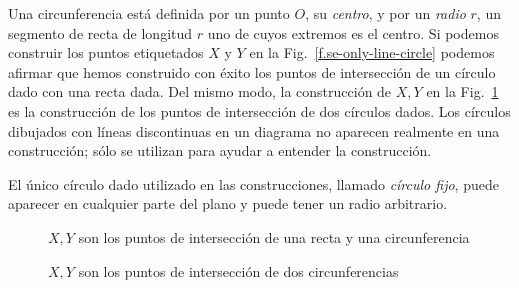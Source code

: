 Una circunferencia está definida por un punto $O$, su \emph{centro}, y por un \emph{radio} $r$, un segmento de recta de longitud $r$ uno de cuyos extremos es el centro. Si podemos construir los puntos etiquetados $X$ y $Y$ en la Fig.~\ref{f.se-only-line-circle} podemos afirmar que hemos construido con éxito los puntos de intersección de un círculo dado con una recta dada. Del mismo modo, la construcción de $X,Y$ en la Fig.~\ref{f.se-only-two-circles} es la construcción de los puntos de intersección de dos círculos dados. Los círculos dibujados con líneas discontinuas en un diagrama no aparecen realmente en una construcción; sólo se utilizan para ayudar a entender la construcción.

El único círculo dado utilizado en las construcciones, llamado \emph{círculo fijo}, puede aparecer en cualquier parte del plano y puede tener un radio arbitrario.

\begin{figure}[t]
\begin{minipage}{.45\textwidth}
\begin{center}
\caption{$X,Y$ son los puntos de intersección de una recta y una circunferencia}\label{f.se-only-line-circle}
\end{center}
\end{minipage}
\hfill
\begin{minipage}{.45\textwidth}
\begin{center}
\caption{$X,Y$ son los puntos de intersección de dos circunferencias}\label{f.se-only-two-circles}
\end{center}
\end{minipage}
\end{figure}

